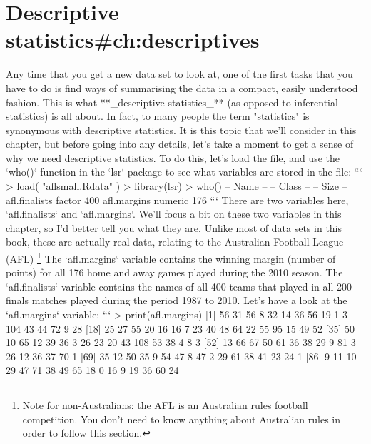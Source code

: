 


\chapter{Descriptive statistics{#ch:descriptives}}


Any time that you get a new data set to look at, one of the first tasks that you have to do is find ways of summarising the data in a compact, easily understood fashion. This is what **_descriptive statistics_** (as opposed to inferential statistics) is all about. In fact, to many people the term "statistics" is synonymous with descriptive statistics. It is this topic that we'll consider in this chapter, but before going into any details, let's take a moment to get a sense of why we need descriptive statistics. To do this, let's load the  file, and use the `who()` function in the `lsr` package to see what variables are stored in the file:
```
> load( "aflsmall.Rdata" )
> library(lsr)
> who()
   -- Name --      -- Class --   -- Size --
   afl.finalists   factor        400       
   afl.margins     numeric       176     
```
There are two variables here, `afl.finalists` and `afl.margins`. We'll focus a bit on these two variables in this chapter, so I'd better tell you what they are. Unlike most of data sets in this book, these are actually real data, relating to the Australian Football League (AFL) \footnote{Note for non-Australians: the AFL is an Australian rules football competition. You don't need to know anything about Australian rules in order to follow this section.} The `afl.margins` variable contains the winning margin (number of points) for all 176 home and away games played during the 2010 season. The `afl.finalists` variable contains the names of all 400 teams that played in all 200 finals matches played during the period 1987 to 2010.  Let's have a look at the `afl.margins` variable:
```
> print(afl.margins)
  [1]  56  31  56   8  32  14  36  56  19   1   3 104  43  44  72   9  28
 [18]  25  27  55  20  16  16   7  23  40  48  64  22  55  95  15  49  52
 [35]  50  10  65  12  39  36   3  26  23  20  43 108  53  38   4   8   3
 [52]  13  66  67  50  61  36  38  29   9  81   3  26  12  36  37  70   1
 [69]  35  12  50  35   9  54  47   8  47   2  29  61  38  41  23  24   1
 [86]   9  11  10  29  47  71  38  49  65  18   0  16   9  19  36  60  24
